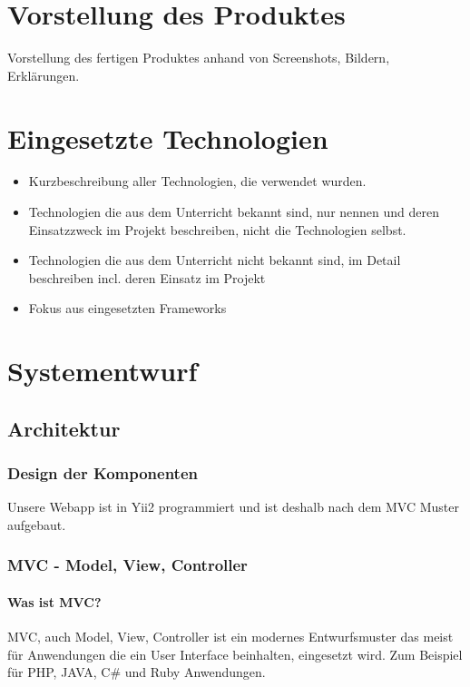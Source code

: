 \chapter{Vorstellung des Produktes}
Vorstellung des fertigen Produktes anhand von Screenshots, Bildern, Erklärungen.

\chapter{Eingesetzte Technologien} \label{sec:tech}
\begin{itemize}
	\item Kurzbeschreibung aller Technologien, die verwendet wurden.
	\item Technologien die aus dem Unterricht bekannt sind, nur nennen und deren  Einsatzzweck im Projekt beschreiben, nicht die Technologien selbst.
	\item Technologien die aus dem Unterricht nicht bekannt sind, im Detail beschreiben incl. deren Einsatz im Projekt
	\item Fokus aus eingesetzten Frameworks
\end{itemize}



\chapter{Systementwurf}

\section{Architektur}
\def \currentAuthor{Florian Tipotsch}
\subsection{Design der Komponenten}

Unsere Webapp ist in Yii2 programmiert und ist deshalb nach dem MVC Muster aufgebaut.
\subsection{MVC - Model, View, Controller}\label{sec:MVC}

\subsubsection{Was ist MVC?} 
MVC, auch Model, View, Controller ist ein modernes Entwurfsmuster das meist für Anwendungen die ein User Interface beinhalten, eingesetzt wird. Zum Beispiel für PHP, JAVA, C\# und Ruby Anwendungen. \cite{MVC}

